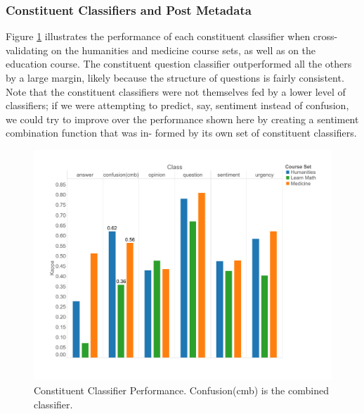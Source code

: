 \documentclass{edm_template}
\begin{document}
\subsubsection{Constituent Classifiers and Post Metadata}

Figure \ref{figure:constituents} illustrates the performance of each constituent classifier when cross-validating on the humanities and medicine course sets, as well as on the education course. The constituent question classifier outperformed all the others by a large margin, likely because the structure of questions is fairly consistent. Note that the constituent classifiers were not themselves fed by a lower level of classifiers; if we were attempting to predict, say, sentiment instead of confusion, we could try to improve over the performance shown here by creating a sentiment combination function that was in- formed by its own set of constituent classifiers.

\begin{figure}[]
       \centering
       \includegraphics[width=1.0\textwidth]{../Figs/classifierEvalsWithEdu.pdf}
       \caption{\textnormal{Constituent Classifier Performance. Confusion(cmb) is the combined classifier.}}
      \label{figure:constituents}
\end{figure}
\end{document}
